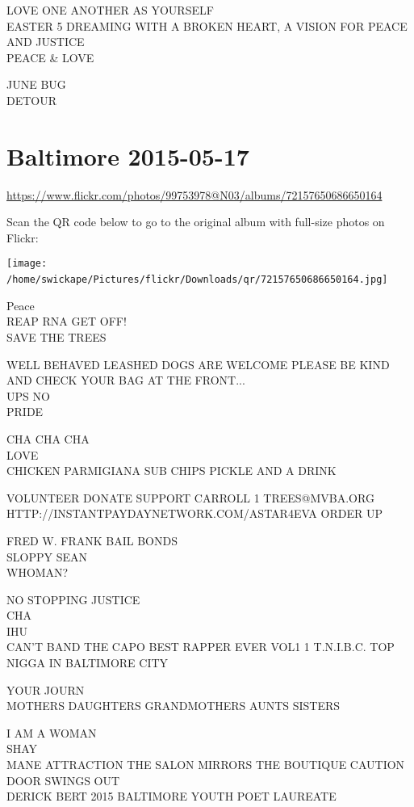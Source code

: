 \documentclass[10pt,letterpaper]{article}
\begin{document}
LOVE ONE ANOTHER AS YOURSELF\\
EASTER 5 DREAMING WITH A BROKEN HEART, A VISION FOR PEACE AND JUSTICE\\
PEACE \& LOVE

JUNE BUG\\
DETOUR
\

\section*{Baltimore 2015-05-17}

\url{https://www.flickr.com/photos/99753978@N03/albums/72157650686650164}

Scan the QR code below to go to the original album with full-size photos on Flickr:

\texttt{[image: /home/swickape/Pictures/flickr/Downloads/qr/72157650686650164.jpg]}
\

Peace\\
REAP RNA GET OFF!\\
SAVE THE TREES

WELL BEHAVED LEASHED DOGS ARE WELCOME PLEASE BE KIND AND CHECK YOUR BAG AT THE FRONT...\\
UPS NO\\
PRIDE

CHA CHA CHA\\
LOVE\\
CHICKEN PARMIGIANA SUB CHIPS PICKLE AND A DRINK

VOLUNTEER DONATE SUPPORT CARROLL 1 TREES@MVBA.ORG\\
HTTP://INSTANTPAYDAYNETWORK.COM/ASTAR4EVA ORDER UP

FRED W. FRANK BAIL BONDS\\
SLOPPY SEAN\\
WHOMAN?

NO STOPPING JUSTICE\\
CHA\\
IHU\\
CAN'T BAND THE CAPO BEST RAPPER EVER VOL1 1 T.N.I.B.C. TOP NIGGA IN BALTIMORE CITY

YOUR JOURN\\
MOTHERS DAUGHTERS GRANDMOTHERS AUNTS SISTERS

I AM A WOMAN\\
SHAY\\
MANE ATTRACTION THE SALON MIRRORS THE BOUTIQUE CAUTION DOOR SWINGS OUT\\
DERICK BERT 2015 BALTIMORE YOUTH POET LAUREATE
\end{document}
